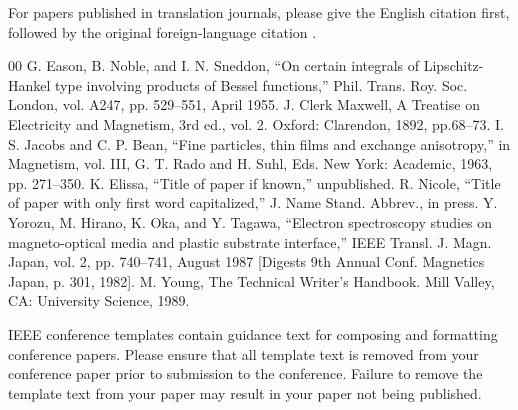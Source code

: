 \documentclass[conference]{IEEEtran}
\begin{document}
For papers published in translation journals, please give the English 
citation first, followed by the original foreign-language citation \cite{b6}.

\begin{thebibliography}{00}
 G. Eason, B. Noble, and I. N. Sneddon, ``On certain integrals of Lipschitz-Hankel type involving products of Bessel functions,'' Phil. Trans. Roy. Soc. London, vol. A247, pp. 529--551, April 1955.
 J. Clerk Maxwell, A Treatise on Electricity and Magnetism, 3rd ed., vol. 2. Oxford: Clarendon, 1892, pp.68--73.
 I. S. Jacobs and C. P. Bean, ``Fine particles, thin films and exchange anisotropy,'' in Magnetism, vol. III, G. T. Rado and H. Suhl, Eds. New York: Academic, 1963, pp. 271--350.
 K. Elissa, ``Title of paper if known,'' unpublished.
 R. Nicole, ``Title of paper with only first word capitalized,'' J. Name Stand. Abbrev., in press.
 Y. Yorozu, M. Hirano, K. Oka, and Y. Tagawa, ``Electron spectroscopy studies on magneto-optical media and plastic substrate interface,'' IEEE Transl. J. Magn. Japan, vol. 2, pp. 740--741, August 1987 [Digests 9th Annual Conf. Magnetics Japan, p. 301, 1982].
 M. Young, The Technical Writer's Handbook. Mill Valley, CA: University Science, 1989.
\end{thebibliography}
\vspace{12pt}
\color{red}
IEEE conference templates contain guidance text for composing and formatting conference papers. Please ensure that all template text is removed from your conference paper prior to submission to the conference. Failure to remove the template text from your paper may result in your paper not being published.
\end{document}
